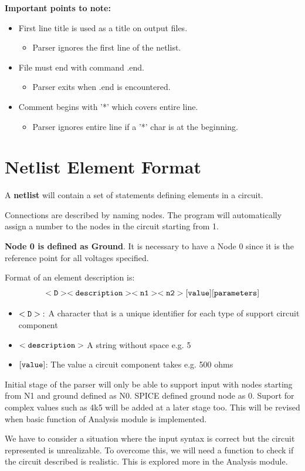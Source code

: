\documentclass[a4paper, titlepage]{article}
\begin{document}
    \textbf{Important points to note:}
    \begin{itemize}
        \item First line {\selectfont title } is used as a title on output files.
        \begin{itemize}
            \item Parser ignores the first line of the netlist.
        \end{itemize}
        \item File must end with command {\selectfont .end}.
        \begin{itemize}
            \item Parser exits when {\selectfont .end} is encountered.
        \end{itemize}
        \item Comment begins with '*' which covers entire line.
        \begin{itemize}
            \item Parser ignores entire line if a '*' char is at the beginning.
        \end{itemize}
    \end{itemize}

    \section{Netlist Element Format}
    A \textbf{netlist} will contain a set of statements defining elements in a circuit.
    \par
    Connections are described by naming nodes. The program will automatically assign a number to the nodes in the circuit
    starting from 1. 
    \par
    \textbf{Node 0 is defined as Ground}. It is necessary to have a Node 0 since it is the reference point for 
    all voltages specified.
    \par
    Format of an element description is:
        $$\tt{<D><description> <n1> <n2> [value] [parameters]}$$
        \begin{itemize}
            \item $\tt{<D>}:$ A character that is a unique identifier for each type of support circuit component
            \item $\tt{<description>}$ A string without space e.g. 5
            \item $\tt{[value]}$: The value a circuit component takes e.g. 500 ohms
        \end{itemize}
    \par
    Initial stage of the parser will only be able to support input with nodes starting from N1 and ground defined as N0.
    SPICE defined ground node as $0$. Suport for complex values such as 4k5 will be added at a later stage too.
    This will be revised when basic function of Analysis module is implemented.
    \par
    We have to consider a situation where the input syntax is correct but the circuit represented is unrealizable.
    To overcome this, we will need a function to check if the circuit described is realistic. This is explored more
    in the Analysis module.
\end{document}
